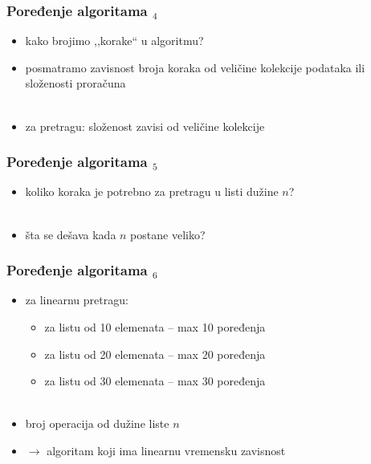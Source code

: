 \documentclass[utf8,compress]{beamer}
\begin{document}
\begin{frame}[fragile]
  \frametitle{Poređenje algoritama $_4$}
  \begin{itemize}
    \item kako brojimo ,,korake`` u algoritmu?
    \item posmatramo zavisnost broja koraka od veličine kolekcije 
      podataka ili složenosti proračuna \\ \ \\
    \item za pretragu: složenost zavisi od veličine kolekcije
  \end{itemize}
\end{frame}

\begin{frame}[fragile]
  \frametitle{Poređenje algoritama $_5$}
  \begin{itemize}
    \item koliko koraka je potrebno za pretragu u listi dužine $n$? \\ \ \\
    \item šta se dešava kada $n$ postane veliko?
  \end{itemize}
\end{frame}

\begin{frame}[fragile]
  \frametitle{Poređenje algoritama $_6$}
  \begin{itemize}
    \item za linearnu pretragu:
    \begin{itemize}
      \item za listu od 10 elemenata -- max 10 poređenja
      \item za listu od 20 elemenata -- max 20 poređenja
      \item za listu od 30 elemenata -- max 30 poređenja \\ \ \\
    \end{itemize}
    \item broj operacija  od dužine liste $n$
    \item $\rightarrow$ algoritam koji ima linearnu vremensku zavisnost
  \end{itemize}
\end{frame}
\end{document}
